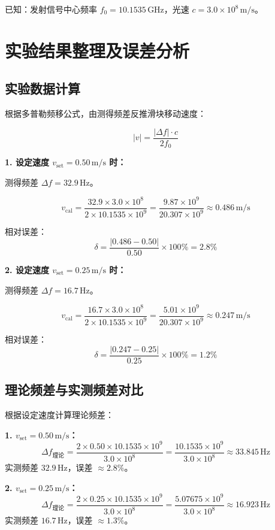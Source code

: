 \documentclass{../ElectromagneticFieldTemplate}
\begin{document}
已知：发射信号中心频率 \(f_0 = 10.1535\,\text{GHz}\)，光速 \(c = 3.0 \times 10^8\,\text{m/s}\)。

\section{实验结果整理及误差分析}

\subsection{实验数据计算}

根据多普勒频移公式，由测得频差反推滑块移动速度：

\[
|v| = \frac{|\Delta f| \cdot c}{2 f_0}
\]

\textbf{1. 设定速度 \(v_{\text{set}} = 0.50\,\text{m/s}\) 时：}

测得频差 \(\Delta f = 32.9\,\text{Hz}\)。

\[
v_{\text{cal}} = \frac{32.9 \times 3.0 \times 10^8}{2 \times 10.1535 \times 10^9} = \frac{9.87 \times 10^9}{20.307 \times 10^9} \approx 0.486\,\text{m/s}
\]

相对误差：
\[
\delta = \frac{|0.486 - 0.50|}{0.50} \times 100\% = 2.8\%
\]

\textbf{2. 设定速度 \(v_{\text{set}} = 0.25\,\text{m/s}\) 时：}

测得频差 \(\Delta f = 16.7\,\text{Hz}\)。

\[
v_{\text{cal}} = \frac{16.7 \times 3.0 \times 10^8}{2 \times 10.1535 \times 10^9} = \frac{5.01 \times 10^9}{20.307 \times 10^9} \approx 0.247\,\text{m/s}
\]

相对误差：
\[
\delta = \frac{|0.247 - 0.25|}{0.25} \times 100\% = 1.2\%
\]

\subsection{理论频差与实测频差对比}

根据设定速度计算理论频差：

\textbf{1. \(v_{\text{set}} = 0.50\,\text{m/s}\)：}
\[
\Delta f_{\text{理论}} = \frac{2 \times 0.50 \times 10.1535 \times 10^9}{3.0 \times 10^8} = \frac{10.1535 \times 10^9}{3.0 \times 10^8} \approx 33.845\,\text{Hz}
\]
实测频差 \(32.9\,\text{Hz}\)，误差 \(\approx 2.8\%\)。

\textbf{2. \(v_{\text{set}} = 0.25\,\text{m/s}\)：}
\[
\Delta f_{\text{理论}} = \frac{2 \times 0.25 \times 10.1535 \times 10^9}{3.0 \times 10^8} = \frac{5.07675 \times 10^9}{3.0 \times 10^8} \approx 16.923\,\text{Hz}
\]
实测频差 \(16.7\,\text{Hz}\)，误差 \(\approx 1.3\%\)。
\end{document}
